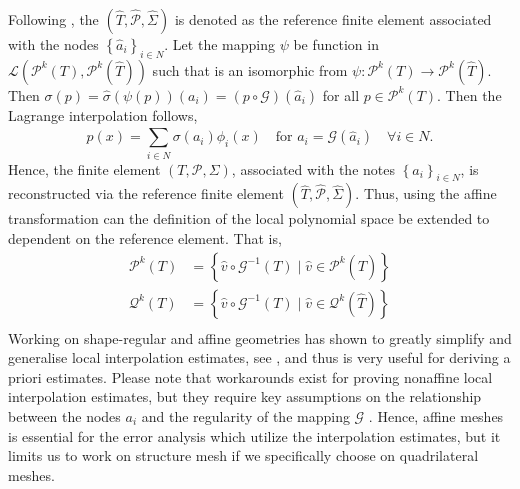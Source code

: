 \documentclass[11pt]{article}
\theoremstyle{remark}
\numberwithin{equation}{section}
\begin{document}
Following \cite[Example 9.4]{ErnGuermond2021}, the $ ( \hat{T}, \hat{\mathcal{P} }, \hat{\Sigma} ) $ is denoted as the reference finite element associated with the nodes $\left\{ \hat{a}_{i} \right\}_{i\in N} $. Let the mapping $\psi $ be function in $\mathcal{L}( \mathcal{P} ^{k}( T), \mathcal{P} ^{k}(\hat{T}
)  )  $ such that is an isomorphic from  $ \psi : \mathcal{P} ^{k}( T) \to \mathcal{P} ^{k}( \hat{T})   $.  Then $\sigma ( p) = \hat{\sigma }( \psi ( p) ) (a_{i} )  = ( p \circ \mathcal{G} )( \hat{a}_{i})      $ for all $p \in \mathcal{P}^{k}( T)  $.
Then the Lagrange interpolation follows,  \[
    p (x) = \sum_{i \in N }^{} \sigma ( a_{i}) \phi_{i}( x) \quad \text{for } a_{i} = \mathcal{G}( \hat{a}_{i}) \quad  \forall i \in N     .
\]
Hence, the finite element $( T, \mathcal{P}, \Sigma  ) $, associated with the notes $\left\{ a_{i} \right\}_{i\in N} $, is reconstructed via the reference finite element $( \hat{T}, \hat{\mathcal{P} }, \hat{\Sigma} ) $.
Thus, using the affine transformation can the definition of the local polynomial space be extended to dependent on the reference element. That is, \[
    \begin{split}
\mathcal{P}^{k}( T) & = \left\{ \hat{v} \circ  \mathcal{G}^{-1}( T)   \mid  \hat{v} \in \mathcal{P}^{k}( \hat{T})      \right\} \\
\mathcal{Q}^{k}( T) & = \left\{ \hat{v} \circ  \mathcal{G}^{-1}( T)     \mid  \hat{v} \in \mathcal{Q}^{k}( \hat{T})      \right\} \\
    \end{split}
\]
Working on shape-regular and affine geometries has shown to greatly simplify and generalise local interpolation estimates, see \cite[Theorem 11.12]{ErnGuermond2021}, and thus is very useful for deriving a priori estimates.
Please note that workarounds exist for proving nonaffine local interpolation estimates, but they require key assumptions on the relationship between the nodes $a_{i}$ and the regularity of the mapping $\mathcal{G} $ \cite[Chapter 13]{ErnGuermond2021}.
Hence, affine meshes is essential for the error analysis which utilize the interpolation estimates, but it limits us to work on structure mesh if we specifically choose on quadrilateral meshes.
\end{document}
